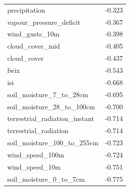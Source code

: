\begin{table}[H]
\begin{tabular}{lc}
		precipitation & -0.323 \\
		vapour\_pressure\_deficit & -0.367 \\
		wind\_gusts\_10m & -0.398 \\
		cloud\_cover\_mid & -0.405 \\
		cloud\_cover & -0.437 \\
		fwix & -0.543 \\
		isi & -0.668 \\
		soil\_moisture\_7\_to\_28cm & -0.695 \\
		soil\_moisture\_28\_to\_100cm & -0.700 \\
		terrestrial\_radiation\_instant & -0.714 \\
		terrestrial\_radiation & -0.714 \\
		soil\_moisture\_100\_to\_255cm & -0.723 \\
		wind\_speed\_100m & -0.724 \\
		wind\_speed\_10m & -0.751 \\
		soil\_moisture\_0\_to\_7cm & -0.775 \\
	\end{tabular}
\end{table}

